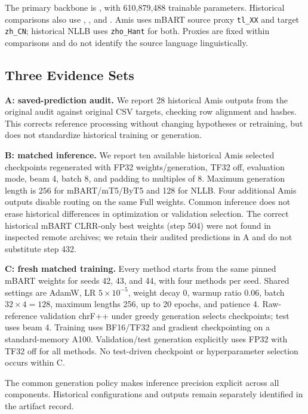 \documentclass[11pt]{article}
\begin{document}
The primary backbone is , with 610,879,488 trainable parameters. Historical comparisons also use , , and . Amis uses mBART source proxy \texttt{tl\_XX} and target \texttt{zh\_CN}; historical NLLB uses \texttt{zho\_Hant} for both. Proxies are fixed within comparisons and do not identify the source language linguistically.

\subsection{Three Evidence Sets}
\label{sec:provenance}
\textbf{A: saved-prediction audit.} We report 28 historical Amis outputs from the original audit against original CSV targets, checking row alignment and hashes. This corrects reference processing without changing hypotheses or retraining, but does not standardize historical training or generation.

\textbf{B: matched inference.} We report ten available historical Amis selected checkpoints regenerated with FP32 weights/generation, TF32 off, evaluation mode, beam 4, batch 8, and padding to multiples of 8. Maximum generation length is 256 for mBART/mT5/ByT5 and 128 for NLLB. Four additional Amis outputs disable routing on the same Full weights. Common inference does not erase historical differences in optimization or validation selection. The correct historical mBART CLRR-only best weights (step 504) were not found in inspected remote archives; we retain their audited predictions in A and do not substitute step 432.

\textbf{C: fresh matched training.} Every method starts from the same pinned mBART weights for seeds 42, 43, and 44, with four methods per seed. Shared settings are AdamW, LR $5\times10^{-5}$, weight decay 0, warmup ratio 0.06, batch $32\times4=128$, maximum lengths 256, up to 20 epochs, and patience 4. Raw-reference validation chrF++ under greedy generation selects checkpoints; test uses beam 4. Training uses BF16/TF32 and gradient checkpointing on a standard-memory A100. Validation/test generation explicitly uses FP32 with TF32 off for all methods. No test-driven checkpoint or hyperparameter selection occurs within C.

The common generation policy makes inference precision explicit across all components. Historical configurations and outputs remain separately identified in the artifact record.
\end{document}
